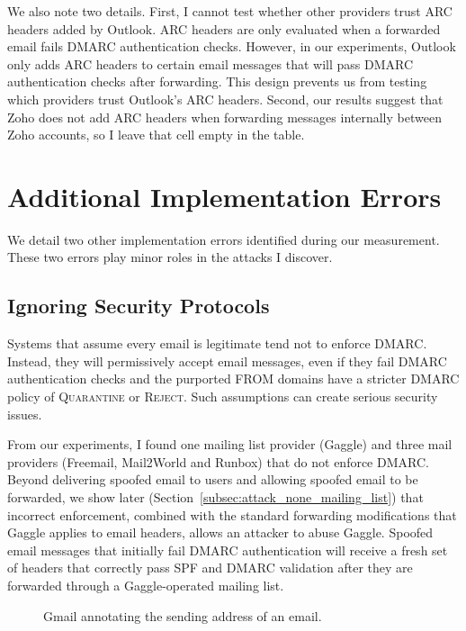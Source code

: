 We also note two details.
First, I cannot test whether other providers trust ARC headers added by Outlook. ARC headers are only evaluated when a forwarded email fails DMARC authentication checks.
However, in our experiments, Outlook only adds ARC headers to certain email messages that will pass DMARC authentication checks after forwarding.
This design prevents us from testing which providers trust Outlook's ARC headers.
Second, our results suggest that Zoho does not add ARC headers when forwarding messages internally between Zoho accounts, so I leave that cell empty in the table.

\section{Additional Implementation Errors}
\label{sec:implementation_errors_additional}
We detail two other implementation errors identified during our measurement. These two errors play minor roles in the attacks I discover.
\subsection{Ignoring Security Protocols}
\label{subsec:no_dmarc}
Systems that assume every email is legitimate tend not to enforce DMARC. Instead, they will permissively accept
email messages, even if they fail DMARC authentication checks and the
purported FROM domains have a stricter DMARC policy of \textsc{Quarantine} or
\textsc{Reject}. Such assumptions can create serious security issues.

From our experiments, I found
one mailing list provider (Gaggle) and three mail providers (Freemail, Mail2World and Runbox) that do not enforce
DMARC.
Beyond delivering spoofed email to users and allowing spoofed email to be forwarded, we
show later (Section~\ref{subsec:attack_none_mailing_list}) that
incorrect enforcement, combined with the standard forwarding
modifications that Gaggle applies to email headers, allows an attacker
to abuse Gaggle. Spoofed email messages that initially fail
DMARC authentication will receive a fresh set of headers that
correctly pass SPF and DMARC validation after they are forwarded
through a Gaggle-operated mailing list.

\begin{figure}[t]
  \centering
{
    \setlength{\fboxsep}{0pt}
    \setlength{\fboxrule}{0.5pt}
}
  \caption{Gmail annotating the sending address of an email. 
}
\label{fig:gmail_via}
\end{figure}

